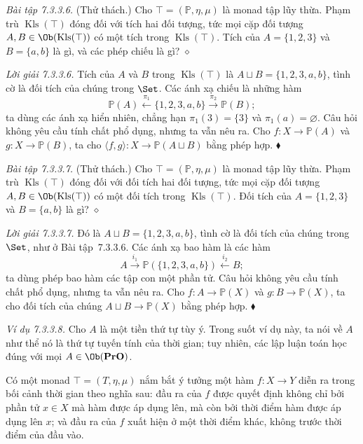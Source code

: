 \noindent\textit{Bài tập 7.3.3.6.}\keepwithnext
(Thử thách.) Cho $\top=(\mathbb P,\eta,\mu)$ là monad tập lũy thừa. Phạm trù $\operatorname{Kls}(\top)$ đóng đối với tích hai đối tượng, tức mọi cặp đối tượng $A,B\in\Ob(\operatorname{Kls}(\top))$ có một tích trong $\operatorname{Kls}(\top)$. Tích của $A=\{1,2,3\}$ và $B=\{a,b\}$ là gì, và các phép chiếu là gì?
\hfill$\diamond$

\noindent\textit{Lời giải 7.3.3.6.}\keepwithnext
Tích của $A$ và $B$ trong $\operatorname{Kls}(\top)$ là $A\sqcup B=\{1,2,3,a,b\}$, tình cờ là đối tích của chúng trong $\Set$. Các ánh xạ chiếu là những hàm
\[
\mathbb P(A)\xleftarrow{\pi_1}\{1,2,3,a,b\}\xrightarrow{\pi_2}\mathbb P(B);
\]
ta dùng các ánh xạ hiển nhiên, chẳng hạn $\pi_1(3)=\{3\}$ và $\pi_1(a)=\varnothing$. Câu hỏi không yêu cầu tính chất phổ dụng, nhưng ta vẫn nêu ra. Cho $f:X\to\mathbb P(A)$ và $g:X\to\mathbb P(B)$, ta cho $\langle f,g\rangle:X\to\mathbb P(A\sqcup B)$ bằng phép hợp.
\hfill$\blacklozenge$

\noindent\textit{Bài tập 7.3.3.7.}\keepwithnext
(Thử thách.) Cho $\top=(\mathbb P,\eta,\mu)$ là monad tập lũy thừa. Phạm trù $\operatorname{Kls}(\top)$ đóng đối với đối tích hai đối tượng, tức mọi cặp đối tượng $A,B\in\Ob(\operatorname{Kls}(\top))$ có một đối tích trong $\operatorname{Kls}(\top)$. Đối tích của $A=\{1,2,3\}$ và $B=\{a,b\}$ là gì?
\hfill$\diamond$

\noindent\textit{Lời giải 7.3.3.7.}\keepwithnext
Đó là $A\sqcup B=\{1,2,3,a,b\}$, tình cờ là đối tích của chúng trong $\Set$, như ở Bài tập~7.3.3.6. Các ánh xạ bao hàm là các hàm
\[
A\xrightarrow{i_1}\mathbb P(\{1,2,3,a,b\})\xleftarrow{i_2}B;
\]
ta dùng phép bao hàm các tập con một phần tử. Câu hỏi không yêu cầu tính chất phổ dụng, nhưng ta vẫn nêu ra. Cho $f:A\to\mathbb P(X)$ và $g:B\to\mathbb P(X)$, ta cho đối tích của chúng $A\sqcup B\to\mathbb P(X)$ bằng phép hợp.
\hfill$\blacklozenge$

\noindent\textit{Ví dụ 7.3.3.8.}\keepwithnext
Cho $A$ là một tiền thứ tự tùy ý. Trong suốt ví dụ này, ta nói về $A$ như thể nó là thứ tự tuyến tính của thời gian; tuy nhiên, các lập luận toán học đúng với mọi $A\in\Ob(\mathbf{PrO})$.

Có một monad $\top=(T,\eta,\mu)$ nắm bắt ý tưởng một hàm $f:X\to Y$ diễn ra trong bối cảnh thời gian theo nghĩa sau: đầu ra của $f$ được quyết định không chỉ bởi phần tử $x\in X$ mà hàm được áp dụng lên, mà còn bởi thời điểm hàm được áp dụng lên $x$; và đầu ra của $f$ xuất hiện ở một thời điểm khác, không trước thời điểm của đầu vào.

